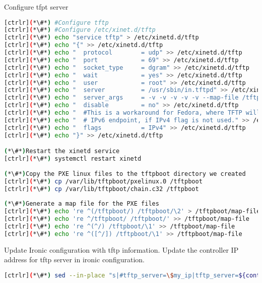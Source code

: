 Configure tfpt server


\begin{lstlisting}[language=bash,keywords={}]
[ctrlr](*\#*) #Configure tftp 
[ctrlr](*\#*) #Configure /etc/xinet.d/tftp
[ctrlr](*\#*) echo "service tftp" > /etc/xinetd.d/tftp
[ctrlr](*\#*) echo "{" >> /etc/xinetd.d/tftp
[ctrlr](*\#*) echo "  protocol        = udp" >> /etc/xinetd.d/tftp
[ctrlr](*\#*) echo "  port            = 69" >> /etc/xinetd.d/tftp
[ctrlr](*\#*) echo "  socket_type     = dgram" >> /etc/xinetd.d/tftp
[ctrlr](*\#*) echo "  wait            = yes" >> /etc/xinetd.d/tftp
[ctrlr](*\#*) echo "  user            = root" >> /etc/xinetd.d/tftp
[ctrlr](*\#*) echo "  server          = /usr/sbin/in.tftpd" >> /etc/xinetd.d/tftp
[ctrlr](*\#*) echo "  server_args     = -v -v -v -v -v --map-file /tftpboot/map-file /tftpboot" >> /etc/xinetd.d/tftp
[ctrlr](*\#*) echo "  disable         = no" >> /etc/xinetd.d/tftp
[ctrlr](*\#*) echo "  #This is a workaround for Fedora, where TFTP will listen only on" >> /etc/xinetd.d/tftp
[ctrlr](*\#*) echo "  # IPv6 endpoint, if IPv4 flag is not used." >> /etc/xinetd.d/tftp
[ctrlr](*\#*) echo "  flags           = IPv4" >> /etc/xinetd.d/tftp
[ctrlr](*\#*) echo "}" >> /etc/xinetd.d/tftp

(*\#*)Restart the xinetd service
[ctrlr](*\#*) systemctl restart xinetd
    
(*\#*)Copy the PXE linux files to the tftpboot directory we created
[ctrlr](*\#*) cp /var/lib/tftpboot/pxelinux.0 /tftpboot
[ctrlr](*\#*) cp /var/lib/tftpboot/chain.c32 /tftpboot
    
(*\#*)Generate a map file for the PXE files
[ctrlr](*\#*) echo 're ^(/tftpboot/) /tftpboot/\2' > /tftpboot/map-file
[ctrlr](*\#*) echo 're ^/tftpboot/ /tftpboot/' >> /tftpboot/map-file
[ctrlr](*\#*) echo 're ^(^/) /tftpboot/\1' >> /tftpboot/map-file
[ctrlr](*\#*) echo 're ^([^/]) /tftpboot/\1' >> /tftpboot/map-file
\end{lstlisting} 


	Update Ironic configuration with tftp information. Update the controller IP address for tftp server in ironic configuration.


\begin{lstlisting}[language=bash,keywords={}]
[ctrlr](*\#*) sed --in-place "s|#tftp_server=\$my_ip|tftp_server=${controller_ip}|" /etc/ironic/ironic.conf
\end{lstlisting} 


